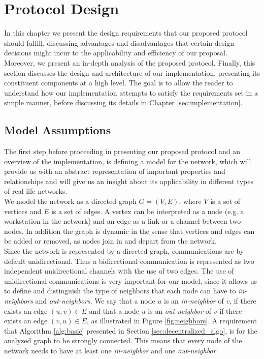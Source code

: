 \documentclass[a4paper,11pt,twoside]{report}
\begin{document}
\chapter{Protocol Design}
\label{sec:design}

In this chapter we present the design requirements that our proposed protocol should fulfill, discussing advantages and disadvantages that certain design decisions might incur to the applicability and efficiency of our proposal. Moreover, we present an in-depth analysis of the proposed protocol. Finally, this section discusses the design and architecture of our implementation, presenting its constituent components at a high level. The goal is to allow the reader to understand how our implementation attempts to satisfy the requirements set in a simple manner, before discussing its details in Chapter \ref{sec:implementation}.

\section{Model Assumptions}
\label{sec:model_assumptions}

The first step before proceeding in presenting our proposed protocol and an overview of the implementation, is defining a model for the network, which will provide us with an abstract representation of important properties and relationships and  will give us an insight about its applicability in different types of real-life networks. \\

We model the network as a directed graph $G = (V,E)$, where $V$ is a set of vertices and $E$ is a set of edges. A vertex can be interpreted as a node (e.g. a workstation in the network) and an edge as a link or a channel between two nodes. In addition the graph is dynamic in the sense that vertices and edges can be added or removed, as nodes join in and depart from the network.\\

Since the network is represented by a directed graph, communications are by default unidirectional. Thus a bidirectional communication is represented as two independent unidirectional channels with the use of two edges. The use of unidirectional communications is very important for our model, since it allows us to define and distinguish the type of neighbors that each node can have to \textit{in-neighbors} and \textit{out-neighbors}. We say that a node $u$ is an \textit{in-neighbor} of $v$, if there exists an edge $(u,v) \in E$ and that a node $u$ is an \textit{out-neighbor} of $v$ if there exists an edge $(v,u) \in E$, as illustrated in Figure \ref{fig:neighbors}. A requirement that Algorithm \ref{alg:basic} presented in Section \ref{sec:decentralized_algo}, is for the analyzed graph to be strongly connected. This means that every node of the network needs to have at least one \textit{in-neighbor} and one \textit{out-neighbor}.\\
\end{document}
